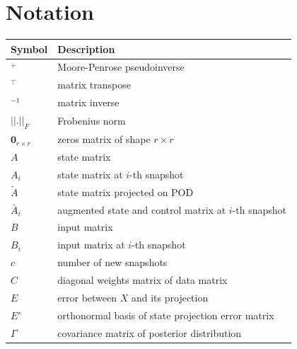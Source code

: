 \section*{Notation}
\begin{table}[ht]
	\centering
	\begin{tabular}{p{2cm}l}
		\toprule
		\textbf{Symbol}                & \textbf{Description}                                    \\
		\midrule
	\(^+\)                         & Moore-Penrose pseudoinverse                             \\
	\(^\top \)                     & matrix transpose                                        \\
	\(^{-1}\)                      & matrix inverse                                          \\
	\(||.||_F\)                    & Frobenius norm                                          \\
	\(\mathbf{0}_{r \times r}\)    & zeros matrix of shape \(r \times r\)                    \\
	\(A\)                          & state matrix                                            \\
	\(A_i\)                        & state matrix at \(i\)-th snapshot                       \\
	\(\tilde{A}\)                  & state matrix projected on POD                           \\
	\(\bar{A}_i\)                  & augmented state and control matrix at \(i\)-th snapshot \\
	\(B\)                          & input matrix                                            \\
	\(B_i\)                        & input matrix at \(i\)-th snapshot                       \\
	\(c\)                          & number of new snapshots                                 \\
	\(C\)                          & diagonal weights matrix of data matrix                  \\
	\(E\)                          & error between \(X\) and its projection                  \\
	\(E'\)                         & orthonormal basis of state projection error matrix      \\
	\(\Gamma \)                    & covariance matrix of posterior distribution             \\

\end{tabular}
\end{table}
